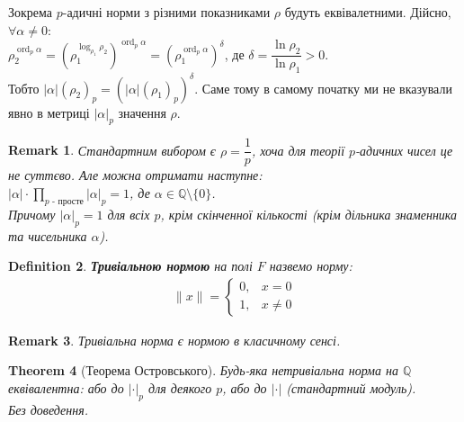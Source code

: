 \documentclass[a4paper, 10pt]{article}
\theoremstyle{theoremdd}
\newtheorem{theorem}{Theorem}[subsection]
\theoremstyle{theoremdd}
\newtheorem{definition}[theorem]{Definition}
\theoremstyle{theoremdd}
\theoremstyle{theoremdd}
\theoremstyle{theoremdd}
\theoremstyle{theoremdd}
\newtheorem{remark}[theorem]{Remark}
\theoremstyle{theoremdd}
\theoremstyle{theoremdd}
\DeclareMathOperator{\ord}{ord}
\begin{document}
Зокрема $p$-адичні норми з різними показниками $\rho$ будуть еквівалетними. Дійсно, $\forall \alpha \neq 0:$\\
$\rho_2^{\ord_p \alpha} = \left( \rho_1^{\log_{\rho_1} \rho_2} \right)^{\ord_p \alpha} = \left(\rho_1^{\ord_p \alpha} \right)^{\delta}$, де $\delta = \dfrac{\ln \rho_2}{\ln \rho_1} > 0$.\\
Тобто $|\alpha|(\rho_2)_p = (|\alpha|(\rho_1)_p)^\delta$. Саме тому в самому початку ми не вказували явно в метриці $|\alpha|_p$ значення $\rho$.

\begin{remark}
Стандартним вибором є $\rho = \dfrac{1}{p}$, хоча для теорії $p$-адичних чисел це не суттєво. Але можна отримати наступне:\\
$|\alpha| \cdot \displaystyle\prod_{p \text{ - просте}} |\alpha|_p = 1$, де $\alpha \in \mathbb{Q} \setminus \{0\}$.\\
Причому $|\alpha|_p = 1$ для всіх $p$, крім скінченної кількості (крім дільника знаменника та чисельника $\alpha$).
\end{remark}

\begin{definition}
\textbf{Тривіальною нормою} на полі $F$ назвемо норму:
\begin{align*}
\lVert x \rVert = \begin{cases} 0, & x = 0 \\ 1, & x \neq 0 \end{cases}
\end{align*}
\end{definition}

\begin{remark}
Тривіальна норма є нормою в класичному сенсі.
\end{remark}

\begin{theorem}[Теорема Островського]
Будь-яка нетривіальна норма на $\mathbb{Q}$ еквівалентна: або до $|\cdot|_p$ для деякого $p$, або до $|\cdot|$ (стандартний модуль).\\
\textit{Без доведення.}
\end{theorem}
\fi
\end{document}
